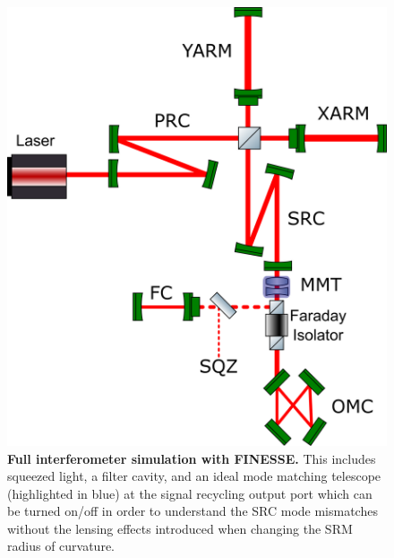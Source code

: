 \begin{figure}[h]
	\centering
	\includegraphics[width=0.8 \textwidth]{../Figures/FullIFO_FINESSE.png}
	\caption[Full interferometer simulation with FINESSE.]
	{\textbf{Full interferometer simulation with FINESSE.} 
		This includes squeezed light, a filter cavity, and an ideal mode matching telescope (highlighted in blue) at the signal recycling output port which can be turned on/off in order to understand the SRC mode mismatches without the lensing effects introduced when changing the SRM radius of curvature.
	}
	\label{fig:IFO_FINESSE}
\end{figure}

